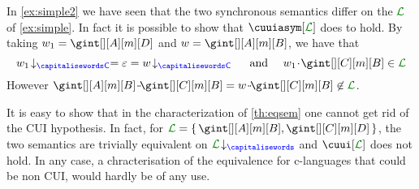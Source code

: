 
 
 \begin{example}
In \cref{ex:simple2} we have seen that the two synchronous semantics differ on the \sclang 
$\clang$ of \cref{ex:simple}.
In fact it is possible to show that $\cuuiasym[{\clang}]$ does to hold.
By taking $\acword_1=\gint[][A][m][D]$ and $\acword=\gint[][A][m][B]$, we have that
$$\proj{\acword_1}{C}=\emptyword = \proj{\acword}{C} \quad\text{ and }\quad \acword_1\cat\gint[][C][m][B]\in\clang$$
However $\gint[][A][m][B]\cat\cat\gint[][C][m][B]= \acword\cat\cat\gint[][C][m][B]\not\in\clang$.
\finex
\end{example}

 
 It is easy to show that in the  characterization of \cref{th:eqsem}  one cannot get rid of the CUI hypothesis.
 In fact, for $\clang=\Set{\gint[][A][m][B], \gint[][C][m][D]}$, the two semantics are
 trivially equivalent on $\proj{\clang}{}$ and $\cuui[\clang]$ does not hold.
 In any case, a chracterisation of the equivalence for c-languages that could be non CUI,
 would hardly be of any use.
 

